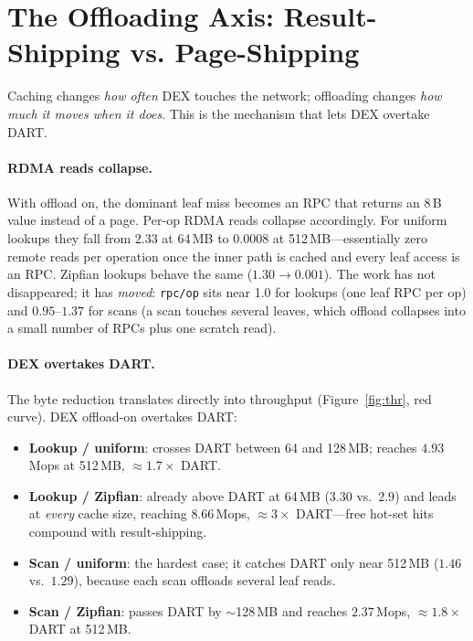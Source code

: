 \documentclass[sigconf,nonacm]{acmart}
\begin{document}
\section{The Offloading Axis: Result-Shipping vs. Page-Shipping}
\label{sec:offload}
Caching changes \emph{how often} DEX touches the network; offloading changes
\emph{how much it moves when it does}. This is the mechanism that lets DEX
overtake DART.

\paragraph{RDMA reads collapse.}
With offload on, the dominant leaf miss becomes an RPC that returns an 8\,B value
instead of a page. Per-op RDMA reads collapse accordingly. For uniform lookups
they fall from $2.33$ at 64\,MB to $0.0008$ at 512\,MB---essentially zero remote
reads per operation once the inner path is cached and every leaf access is an
RPC. Zipfian lookups behave the same ($1.30\to0.001$). The work has not
disappeared; it has \emph{moved}: \texttt{rpc/op} sits near 1.0 for lookups (one
leaf RPC per op) and $0.95$--$1.37$ for scans (a scan touches several leaves,
which offload collapses into a small number of RPCs plus one scratch read).

\paragraph{DEX overtakes DART.}
The byte reduction translates directly into throughput (Figure~\ref{fig:thr},
red curve). DEX offload-on overtakes DART:
\begin{itemize}
  \item \textbf{Lookup / uniform}: crosses DART between 64 and 128\,MB; reaches
        $4.93$\,Mops at 512\,MB, $\approx1.7\times$ DART.
  \item \textbf{Lookup / Zipfian}: already above DART at 64\,MB ($3.30$ vs.\
        $2.9$) and leads at \emph{every} cache size, reaching $8.66$\,Mops,
        $\approx3\times$ DART---free hot-set hits compound with result-shipping.
  \item \textbf{Scan / uniform}: the hardest case; it catches DART only near
        512\,MB ($1.46$ vs.\ $1.29$), because each scan offloads several leaf
        reads.
  \item \textbf{Scan / Zipfian}: passes DART by $\sim$128\,MB and reaches
        $2.37$\,Mops, $\approx1.8\times$ DART at 512\,MB.
\end{itemize}
\end{document}
